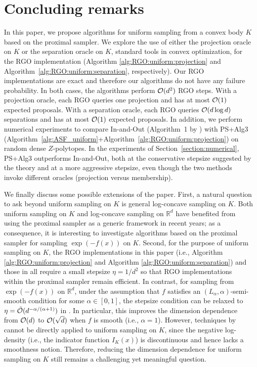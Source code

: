 \documentclass[11pt,letterpaper]{article}
\newcommand{\R}{\mathbb{R}}
\begin{document}
\section{Concluding remarks}
In this paper, we propose algorithms for uniform sampling from a convex body $K$ based on the proximal sampler. We explore the use of either the projection oracle on $K$ or the separation oracle on $K$, standard tools in convex optimization, for the RGO implementation (Algorithm \ref{alg:RGO:uniform:projection} and Algorithm~\ref{alg:RGO:uniform:separation}, respectively). Our RGO implementations are exact and therefore our algorithms do not have any failure probability. In both cases, the algorithms perform ${\cal O}(d^2)$ RGO steps. With a projection oracle, each RGO queries one projection and has at most ${\cal O}(1)$ expected proposals. With a separation oracle, each RGO queries ${\cal O}(d\log d)$ separations and has at most ${\cal O}(1)$ expected proposals. In addition, we perform numerical experiments to compare In-and-Out (Algorithm~1 by \cite{kook2024inandout}) with PS+Alg3 (Algorithm~\ref{alg:ASF_uniform}+Algorithm~\ref{alg:RGO:uniform:projection}) on random dense $Z$-polytopes. In the experiments of Section~\ref{section:numerical}, PS+Alg3 outperforms In-and-Out, both at the conservative stepsize suggested by the theory and at a more aggressive stepsize, even though the two methods invoke different oracles (projection versus membership).

We finally discuss some possible extensions of the paper. First, a natural question to ask beyond uniform sampling on $K$ is general log-concave sampling on $K$. Both uniform sampling on $K$ and log-concave sampling on $\R^d$ have benefited from using the proximal sampler as a generic framework in recent years; as a consequence, it is interesting to investigate algorithms based on the proximal sampler for sampling $\exp(-f(x))$ on $K$.
Second, for the purpose of uniform sampling on $K$, the RGO implementations in this paper (i.e., Algorithm \ref{alg:RGO:uniform:projection} and Algorithm \ref{alg:RGO:uniform:separation}) and 
those in \cite{kook2024inandout,kook2025coldstart,kook2025zeroth} all require a small stepsize $\eta=1/d^2$ so that RGO implementations within the proximal sampler remain efficient.
In contrast, for sampling from $\exp(-f(x))$ on $\R^d$, under the assumption that $f$ satisfies an $(L_\alpha, \alpha)$-semi-smooth condition for some $\alpha\in [0,1]$, the stepsize condition can be relaxed to $\eta= \tilde {\cal O}(d^{-\alpha/(\alpha+1)})$ in \cite{fan2023improved}. In particular, this improves the dimension dependence from ${\cal O}(d)$ to ${\cal O}(\sqrt{d})$ when $f$ is smooth (i.e., $\alpha=1$). However, techniques by \cite{fan2023improved} cannot be directly applied to uniform sampling on $K$, since the negative log-density (i.e., the indicator function $I_K(x)$) is discontinuous and hence lacks a smoothness notion. Therefore, reducing the dimension dependence for uniform sampling on $K$ still remains a challenging yet meaningful question.
\end{document}
